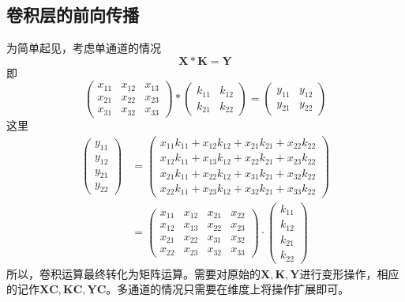 \subsection{卷积层的前向传播}
为简单起见，考虑单通道的情况
\begin{equation}
	\boldsymbol{X} * \boldsymbol{K} = \boldsymbol{Y}
\end{equation}
即
\begin{equation}
	\begin{pmatrix}
	x_{11}&  x_{12}& x_{13} \\ 
	x_{21}&  x_{22}&  x_{23}\\ 
	x_{31}&  x_{32}& x_{33}
	\end{pmatrix} * 
	\begin{pmatrix}
	k_{11}& k_{12} \\ 
	k_{21}& k_{22}
	\end{pmatrix} =
	\begin{pmatrix}
	y_{11}& y_{12} \\ 
	y_{21}& y_{22}
	\end{pmatrix} 
\end{equation}
这里
\begin{equation}
	\begin{aligned}
	\begin{pmatrix}
	y_{11}\\ 
	y_{12}\\ 
	y_{21}\\ 
	y_{22}
	\end{pmatrix} &= 
	\begin{pmatrix}
	x_{11}k_{11} +x_{12}k_{12} +x_{21}k_{21} +x_{22}k_{22} \\ 
	x_{12}k_{11} +x_{13}k_{12} +x_{22}k_{21} +x_{23}k_{22}\\
	x_{21}k_{11} +x_{22}k_{12} +x_{31}k_{21} +x_{32}k_{22}\\
	x_{22}k_{11} +x_{23}k_{12} +x_{32}k_{21} +x_{33}k_{22}
	\end{pmatrix}\\
	&=\begin{pmatrix}
	x_{11} &x_{12} &x_{21} &x_{22}  \\ 
	x_{12} &x_{13} &x_{22} &x_{23} \\
	x_{21} &x_{22} &x_{31} &x_{32} \\
	x_{22} &x_{23} &x_{32} &x_{33} 
	\end{pmatrix} \cdot 
	\begin{pmatrix}
	k_{11}\\ 
	k_{12}\\ 
	k_{21}\\ 
	k_{22}
	\end{pmatrix}
	\end{aligned}
\end{equation}
所以，卷积运算最终转化为矩阵运算。需要对原始的$\boldsymbol{X},\boldsymbol{K},\boldsymbol{Y}$进行变形操作，相应的记作$\boldsymbol{XC},\boldsymbol{KC},\boldsymbol{YC}$。多通道的情况只需要在维度上将操作扩展即可。
